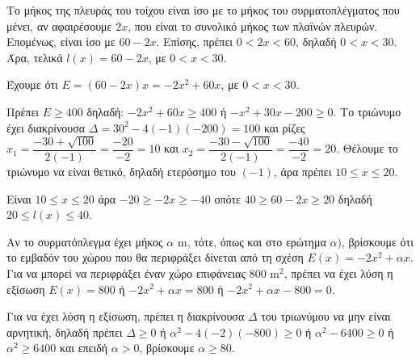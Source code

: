
\begin{alist}
\item
\begin{rlist}
\item Το μήκος της πλευράς του τοίχου είναι ίσο με το μήκος του συρματοπλέγματος που
μένει, αν αφαιρέσουμε $2x$, που είναι το συνολικό μήκος των πλαϊνών πλευρών.
Επομένως, είναι ίσο με $60 - 2x$. Επίσης, πρέπει $0 < 2x < 60$, δηλαδή $0 < x < 30$.
Άρα, τελικά $l(x) = 60 - 2x$, με $0 < x < 30$.
\item Έχουμε ότι $E = (60 - 2x)x = -2x^2 + 60x$, με $0 < x < 30$.
\end{rlist}

\item
\begin{rlist}
\item Πρέπει $E \ge 400$ δηλαδή: $-2x^2 + 60x \ge 400$ ή $-x^2 + 30x - 200 \ge 0$.
Το τριώνυμο έχει διακρίνουσα $\Delta = 30^2 - 4(-1)(-200) = 100$ και ρίζες $x_1 = \dfrac{-30 + \sqrt{100}}{2(-1)} = \dfrac{-20}{-2} = 10$ και $x_2 = \dfrac{-30 - \sqrt{100}}{2(-1)} = \dfrac{-40}{-2} = 20$. Θέλουμε το τριώνυμο να είναι θετικό, δηλαδή ετερόσημο του $(-1)$, άρα πρέπει $10 \le x \le 20$.
\item Είναι $10 \le x \le 20$
άρα $-20 \ge -2x \ge -40$
οπότε $40 \ge 60 - 2x \ge 20$
δηλαδή $20 \le l(x) \le 40$.
\end{rlist}

\item Αν το συρματόπλεγμα έχει μήκος $\alpha\text{ m}$, τότε, όπως και στο ερώτημα $\alpha)$, βρίσκουμε ότι το
εμβαδόν του χώρου που θα περιφράξει δίνεται από τη σχέση $E(x) = -2x^2 + \alpha x$. Για να
μπορεί να περιφράξει έναν χώρο επιφάνειας $800\text{ m}^2$, πρέπει να έχει λύση η εξίσωση
$E(x) = 800$ ή $-2x^2 + \alpha x = 800$ ή $-2x^2 + \alpha x - 800 = 0$.

Για να έχει λύση η εξίσωση, πρέπει η διακρίνουσα $\Delta$ του τριωνύμου να μην είναι αρνητική,
δηλαδή πρέπει
$\Delta \ge 0$
ή
$\alpha^2 - 4(-2)(-800) \ge 0$
ή
$\alpha^2 - 6400 \ge 0$
ή
$\alpha^2 \ge 6400$
και επειδή $\alpha > 0$, βρίσκουμε $\alpha \ge 80$.
\end{alist}

